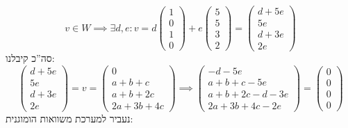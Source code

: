 \documentclass[]{article}
\newcommand\co        {\colon}
\newcommand\pms[1]    {\begin{pmatrix}
        #1
\end{pmatrix}}
\theoremstyle{definition}
\begin{document}
        \[ v \in W \implies \exists d, e \co v = d\pms{1 \\ 0 \\ 1 \\ 0} + e\pms{5 \\ 5 \\ 3 \\ 2} = \pms{d + 5e \\ 5e \\ d + 3e \\ 2e} \]
        סה''כ קיבלנו: 
        \[ \pms{d + 5e \\ 5e \\ d + 3e \\ 2e} = v = \pms{0 \\ a+ b + c \\ a + b + 2c \\ 2a + 3b + 4c} \implies \pms{-d - 5e \\ a + b + c - 5e \\ a+ b + 2c - d - 3e \\ 2a + 3b + 4c - 2e} = \pms{0 \\ 0 \\ 0 \\0} \]
        נעביר למערכת משוואות הומוגנית: 
\end{document}
